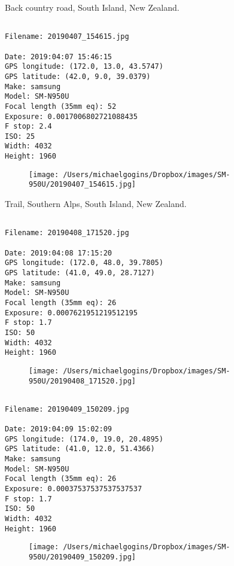 \documentclass[11pt,letter,DIV=14,paper=landscape]{scrbook}
\begin{document}
\clearpage
\noindent Back country road, South Island, New Zealand.
\noindent
\begin{lstlisting}

Filename: 20190407_154615.jpg

Date: 2019:04:07 15:46:15
GPS longitude: (172.0, 13.0, 43.5747)
GPS latitude: (42.0, 9.0, 39.0379)
Make: samsung
Model: SM-N950U
Focal length (35mm eq): 52
Exposure: 0.0017006802721088435
F stop: 2.4
ISO: 25
Width: 4032
Height: 1960
\end{lstlisting}
\clearpage

\begin{figure}
\texttt{[image: /Users/michaelgogins/Dropbox/images/SM-950U/20190407\_154615.jpg]}
\end{figure}
    
\clearpage
\noindent Trail, Southern Alps, South Island, New Zealand.
\noindent
\begin{lstlisting}

Filename: 20190408_171520.jpg

Date: 2019:04:08 17:15:20
GPS longitude: (172.0, 48.0, 39.7805)
GPS latitude: (41.0, 49.0, 28.7127)
Make: samsung
Model: SM-N950U
Focal length (35mm eq): 26
Exposure: 0.0007621951219512195
F stop: 1.7
ISO: 50
Width: 4032
Height: 1960
\end{lstlisting}
\clearpage

\begin{figure}
\texttt{[image: /Users/michaelgogins/Dropbox/images/SM-950U/20190408\_171520.jpg]}
\end{figure}
    
\clearpage
\noindent 
\noindent
\begin{lstlisting}

Filename: 20190409_150209.jpg

Date: 2019:04:09 15:02:09
GPS longitude: (174.0, 19.0, 20.4895)
GPS latitude: (41.0, 12.0, 51.4366)
Make: samsung
Model: SM-N950U
Focal length (35mm eq): 26
Exposure: 0.00037537537537537537
F stop: 1.7
ISO: 50
Width: 4032
Height: 1960
\end{lstlisting}
\clearpage

\begin{figure}
\texttt{[image: /Users/michaelgogins/Dropbox/images/SM-950U/20190409\_150209.jpg]}
\end{figure}
    
\end{document}
